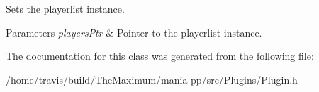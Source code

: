 Sets the playerlist instance. 


\begin{DoxyParams}{Parameters}
{\em players\-Ptr} & Pointer to the playerlist instance. \\
\hline
\end{DoxyParams}


The documentation for this class was generated from the following file\-:\begin{DoxyCompactItemize}
\item 
/home/travis/build/\-The\-Maximum/mania-\/pp/src/\-Plugins/Plugin.\-h\end{DoxyCompactItemize}
